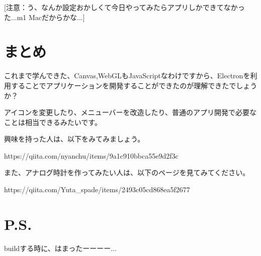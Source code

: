 \documentclass[mingoth,11pt,a4j,uplatex]{jsarticle}
\begin{document}
[注意：う、なんか設定おかしくて今日やってみたらアプリしかできてなかった...m1 Macだからかな...]

\section{まとめ}
これまで学んできた、Canvas,WebGLもJavaScriptなわけですから、Electronを利用することでアプリケーションを開発することができたのが理解できたでしょうか？

\vspace{1em}
アイコンを変更したり、メニューバーを改造したり、普通のアプリ開発で必要なことは相当できるみたいです。

興味を持った人は、以下をみてみましょう。

https://qiita.com/nyanchu/items/9a1c910bbca55e9d2f3c

また、アナログ時計を作ってみたい人は、以下のページを見てみてください。

https://qiita.com/Yuta\_spade/items/2493c05cd868ea5f2677

\section*{P.S.}
buildする時に、はまったーーーー...


\end{document}
